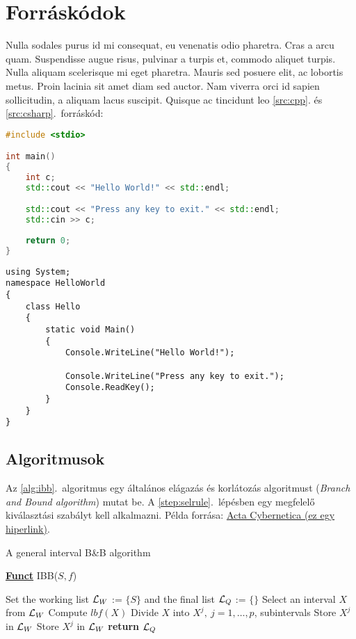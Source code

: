\section{Forráskódok}

Nulla sodales purus id mi consequat, eu venenatis odio pharetra. Cras a arcu quam. Suspendisse augue risus, pulvinar a turpis et, commodo aliquet turpis. Nulla aliquam scelerisque mi eget pharetra. Mauris sed posuere elit, ac lobortis metus. Proin lacinia sit amet diam sed auctor. Nam viverra orci id sapien sollicitudin, a aliquam lacus suscipit. Quisque ac tincidunt leo \ref{src:cpp}. és \ref{src:csharp}.~forráskód:

\begin{lstlisting}[language={C++}]
#include <stdio>

int main() 
{
	int c;
	std::cout << "Hello World!" << std::endl;

	std::cout << "Press any key to exit." << std::endl;
	std::cin >> c;
	
	return 0;
}
\end{lstlisting}

\begin{lstlisting}[language={[Sharp]C}]
using System;
namespace HelloWorld
{
	class Hello 
	{
		static void Main() 
		{
			Console.WriteLine("Hello World!");
			
			Console.WriteLine("Press any key to exit.");
			Console.ReadKey();
		}
	}
}
\end{lstlisting}

\subsection{Algoritmusok}

Az \ref{alg:ibb}.~algoritmus egy általános elágazás és korlátozás algoritmust (\emph{Branch and Bound algorithm}) mutat be. A \ref{step:selrule}.~lépésben egy megfelelő kiválasztási szabályt kell alkalmazni.
Példa forrása: \href{https://www.inf.u-szeged.hu/actacybernetica/}{Acta Cybernetica (ez egy hiperlink)}.

\begin{algorithm}[H]
\caption{A general interval B\&B algorithm}
\label{alg:ibb}
\textbf{\underline{Funct}} IBB($S,f$)
\begin{algorithmic}[1] %
\State Set the working list ${\cal L}_W$ := $\{S\}$ and the final list ${\cal L}_Q$ := $\{\}$
 \label{alg:igoend}
	\State Select an interval $X$ from ${\cal L}_W$ \label{step:selrule}
	\State Compute $lbf(X)$ 
	 
		\State Divide $X$ into $X^j,\ j=1,\dots, p$, subintervals   
			 
				\State Store $X^j$ in ${\cal L}_W$
			\Else
				\State Store $X^j$ in ${\cal L}_W$
			\EndIf
		\EndFor
	\EndIf
\EndWhile
\State \textbf{return} ${\cal L}_Q$
\end{algorithmic}
\end{algorithm}